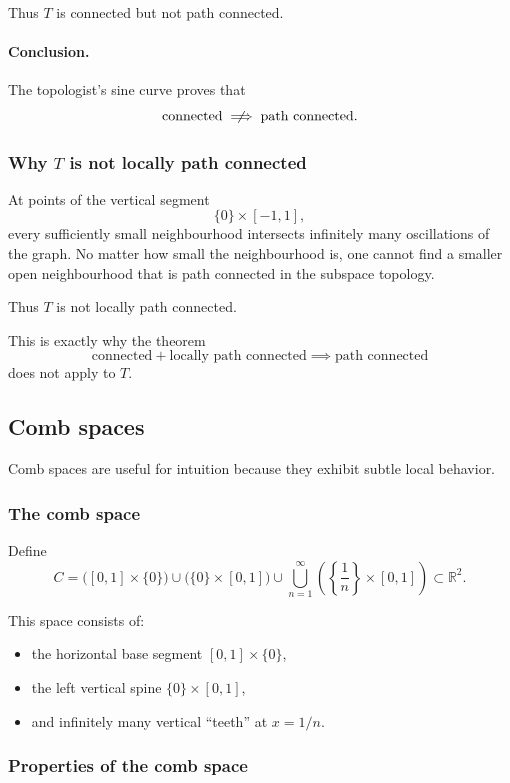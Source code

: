 \documentclass[12pt,a4paper]{article}
\theoremstyle{notespace}
\begin{document}
Thus \(T\) is connected but not path connected.

\paragraph{Conclusion.}
The topologist's sine curve proves that
\[
\text{connected} \centernot\implies \text{path connected}.
\]

\subsubsection{Why \(T\) is not locally path connected}

At points of the vertical segment
\[
\{0\}\times[-1,1],
\]
every sufficiently small neighbourhood intersects infinitely many oscillations of the graph. No matter how small the neighbourhood is, one cannot find a smaller open neighbourhood that is path connected in the subspace topology.

Thus \(T\) is not locally path connected.

This is exactly why the theorem
\[
\text{connected}+\text{locally path connected}\implies \text{path connected}
\]
does not apply to \(T\).

\subsection{Comb spaces}

Comb spaces are useful for intuition because they exhibit subtle local behavior.

\subsubsection{The comb space}

Define
\[
C
=
\bigl([0,1]\times\{0\}\bigr)
\cup
\bigl(\{0\}\times[0,1]\bigr)
\cup
\bigcup_{n=1}^{\infty}
\left(
\left\{\frac{1}{n}\right\}\times[0,1]
\right)
\subset \mathbb{R}^2.
\]

This space consists of:
\begin{itemize}
	\item the horizontal base segment \([0,1]\times\{0\}\),
	\item the left vertical spine \(\{0\}\times[0,1]\),
	\item and infinitely many vertical ``teeth'' at \(x=1/n\).
\end{itemize}

\subsubsection{Properties of the comb space}
\end{document}
